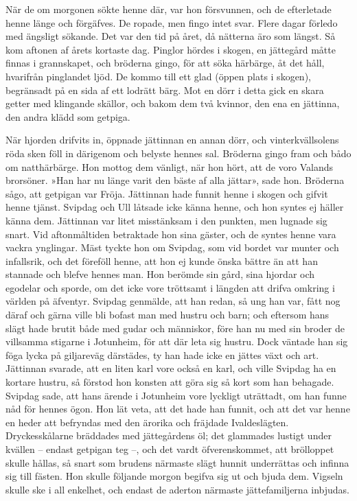 När de om morgonen sökte henne där, var hon försvunnen, och de
efterletade henne länge och förgäfves. De ropade, men fingo intet svar.
Flere dagar förledo med ängsligt sökande. Det var den tid på året, då
nätterna äro som längst. Så kom aftonen af årets kortaste dag. Pinglor
hördes i skogen, en jättegård måtte finnas i grannskapet, och bröderna
gingo, för att söka härbärge, åt det håll, hvarifrån pinglandet ljöd. De
kommo till ett glad (öppen plats i skogen), begränsadt på en sida af ett
lodrätt bärg. Mot en dörr i detta gick en skara getter med klingande
skällor, och bakom dem två kvinnor, den ena en jättinna, den andra klädd
som getpiga.

När hjorden drifvits in, öppnade jättinnan en annan dörr, och
vinterkvällsolens röda sken föll in därigenom och belyste hennes sal.
Bröderna gingo fram och bådo om natthärbärge. Hon mottog dem vänligt,
när hon hört, att de voro Valands brorsöner. »Han har nu länge varit den
bäste af alla jättar», sade hon. Bröderna sågo, att getpigan var Fröja.
Jättinnan hade funnit henne i skogen och gifvit henne tjänst. Svipdag
och Ull låtsade icke känna henne, och hon syntes ej häller känna dem.
Jättinnan var litet misstänksam i den punkten, men lugnade sig snart.
Vid aftonmåltiden betraktade hon sina gäster, och de syntes henne vara
vackra ynglingar. Mäst tyckte hon om Svipdag, som vid bordet var munter
och infallsrik, och det föreföll henne, att hon ej kunde önska bättre än
att han stannade och blefve hennes man. Hon berömde sin gård, sina
hjordar och egodelar och sporde, om det icke vore tröttsamt i längden
att drifva omkring i världen på äfventyr. Svipdag genmälde, att han
redan, så ung han var, fått nog däraf och gärna ville bli bofast man med
hustru och barn; och eftersom hans slägt hade brutit både med gudar och
människor, före han nu med sin broder de villsamma stigarne i Jotunheim,
för att där leta sig hustru. Dock väntade han sig föga lycka på
giljareväg därstädes, ty han hade icke en jättes växt och art. Jättinnan
svarade, att en liten karl vore också en karl, och ville Svipdag ha en
kortare hustru, så förstod hon konsten att göra sig så kort som han
behagade. Svipdag sade, att hans ärende i Jotunheim vore lyckligt
uträttadt, om han funne nåd för hennes ögon. Hon lät veta, att det hade
han funnit, och att det var henne en heder att befryndas med den ärorika
och fräjdade Ivaldeslägten. Dryckesskålarne bräddades med jättegårdens
öl; det glammades lustigt under kvällen -- endast getpigan teg --, och
det vardt öfverenskommet, att brölloppet skulle hållas, så snart som
brudens närmaste slägt hunnit underrättas och infinna sig till fästen.
Hon skulle följande morgon begifva sig ut och bjuda dem. Vigseln skulle
ske i all enkelhet, och endast de aderton närmaste jättefamiljerna
inbjudas.



